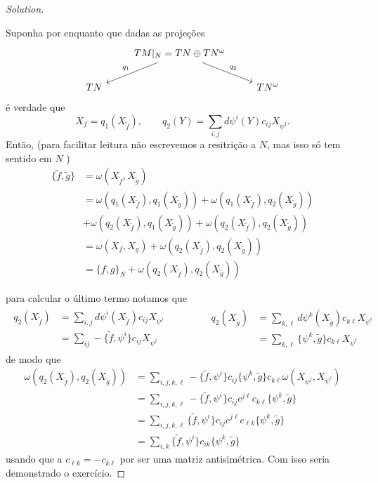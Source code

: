 \begin{proof}[Solution]
\begin{enumerate}[label=\alph*.]
Suponha por enquanto que dadas as proje\c c\~oes
\[\begin{tikzcd}
&TM|_{N}=T N\oplus T N^\omega\arrow[dl,"q_1",swap]\arrow[dr,"q_2"]\\
T N&&T N^{\omega}
\end{tikzcd}\]
\'e verdade que
\[X_f=q_1(X_{\tilde{f}}),\qquad q_2(Y)=\sum_{i,j}d\psi^i(Y)c_{ij}X_{\psi^j}.\]
Ent\~ao, (para facilitar leitura n\~ao escrevemos a resitri\c c\~ao a $N$, mas isso s\'o tem sentido em $N$ )
\begin{align*}
	\{\tilde{f},\tilde{g}\}&=\omega(X_{\tilde{f}},X_{\tilde{g}})\\
			       &=\omega(q_1(X_{\tilde{f}}),q_1(X_{\tilde{g}}))+\omega(q_1(X_{\tilde{f}}),q_2(X_{\tilde{g}}))\\
	&+\omega(q_2(X_{\tilde{f}}),q_1(X_{\tilde{g}}))+\omega(q_2(X_{\tilde{f}}),q_2(X_{\tilde{g}}))\\
	&=\omega(X_{f},X_{g})+\omega(q_2(X_{\tilde{f}}),q_2(X_{\tilde{g}}))\\
	&=\{f,g\}_{N}+\omega(q_2(X_{\tilde{f}}),q_2(X_{\tilde{g}}))
\end{align*}
	\end{enumerate}
	para calcular o \'ultimo termo notamos que
	\begin{align*}
		\begin{aligned}
		q_2(X_{\tilde{f}})&=\sum_{i,j}d\psi^i(X_{\tilde{f}})c_{ij}X_{\psi^j}\\
		&=\sum_{ij}-\{\tilde{f},\psi^i\} c_{ij}X_{\psi^j}
	\end{aligned}\qquad\quad \quad 
	\begin{aligned}
		q_2(X_{\tilde{g}})&=\sum_{k,\ell}d\psi^k(X_{\tilde{g}})c_{k \ell}X_{\psi^\ell}\\
		&=\sum_{k,\ell}\{\psi^k,\tilde{g}\} c_{k \ell}X_{\psi^\ell}
	\end{aligned}
	\end{align*}
	de modo que
	\begin{align*}
		\omega(q_2(X_{\tilde{f}}),q_2(X_{\tilde{g}}))&=\sum_{i,j,k,\ell} -\{\tilde{f},\psi^i\} c_{ij}\{\psi^k,\tilde{g}\} c_{k \ell}\omega(X_{\psi^j},X_{\psi^\ell})\\
	&=\sum_{i,j,k,\ell} -\{\tilde{f},\psi^i\} c_{ij}c^{j\ell}c_{k \ell}\{\psi^k,\tilde{g}\}\\
	&=\sum_{i,j,k,\ell} \{\tilde{f},\psi^i\} c_{ij}c^{j\ell}c_{\ell k}\{\psi^k,\tilde{g}\}\\
	&=\sum_{i,k} \{\tilde{f},\psi^i\} c_{i k}\{\psi^k,\tilde{g}\}
	\end{align*}
	usando que a $c_{\ell k}=-c_{k\ell}$ por ser uma matriz antisim\'etrica. Com isso seria demonstrado o exerc\'icio.


\end{proof}

